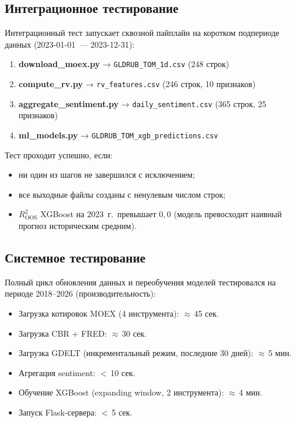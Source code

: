 \subsection{Интеграционное тестирование}

Интеграционный тест запускает сквозной пайплайн на коротком
подпериоде данных (2023-01-01~--- 2023-12-31):

\begin{enumerate}
    \item \textbf{download\_moex.py} → \texttt{GLDRUB\_TOM\_1d.csv} (248 строк)
    \item \textbf{compute\_rv.py} → \texttt{rv\_features.csv} (246 строк, 10 признаков)
    \item \textbf{aggregate\_sentiment.py} → \texttt{daily\_sentiment.csv} (365 строк, 25 признаков)
    \item \textbf{ml\_models.py} → \texttt{GLDRUB\_TOM\_xgb\_predictions.csv}
\end{enumerate}

Тест проходит успешно, если:
\begin{itemize}
    \item ни один из шагов не завершился с исключением;
    \item все выходные файлы созданы с ненулевым числом строк;
    \item $R^2_{\mathrm{OOS}}$ XGBoost на 2023~г.\ превышает $0{,}0$
          (модель превосходит наивный прогноз историческим средним).
\end{itemize}

\subsection{Системное тестирование}

Полный цикл обновления данных и переобучения моделей тестировался
на периоде 2018--2026 (производительность):

\begin{itemize}
    \item Загрузка котировок MOEX (4 инструмента): $\approx$\,45 сек.
    \item Загрузка CBR + FRED: $\approx$\,30 сек.
    \item Загрузка GDELT (инкрементальный режим, последние 30 дней): $\approx$\,5 мин.
    \item Агрегация sentiment: $<$\,10 сек.
    \item Обучение XGBoost (expanding window, 2 инструмента): $\approx$\,4 мин.
    \item Запуск Flask-сервера: $<$\,5 сек.
\end{itemize}


